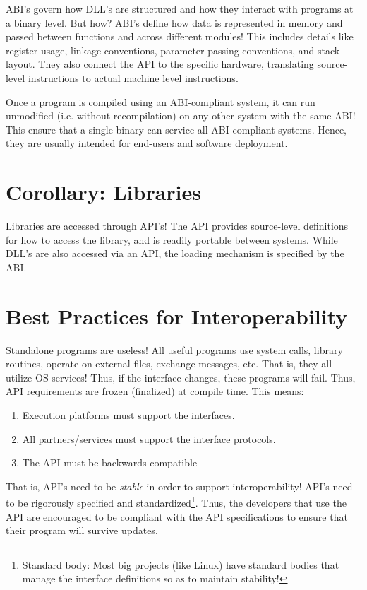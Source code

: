 \documentclass{report}
\begin{document}
ABI's govern how DLL's are structured and how they interact with programs at a binary level. But
how? ABI's define how data is represented in memory and passed between functions and across
different modules! This includes details like register usage, linkage conventions, parameter passing
conventions, and stack layout. They also connect the API to the specific hardware, translating
source-level instructions to actual machine level instructions.

Once a program is compiled using an ABI-compliant system, it can run unmodified (i.e. without
recompilation) on any other system with the same ABI! This ensure that a single binary can service 
all ABI-compliant systems. Hence, they are usually intended for end-users and software deployment.


\section{Corollary: Libraries}
Libraries are accessed through API's! The API provides source-level definitions for how to access
the library, and is readily portable between systems. While DLL's are also accessed via an API, the
loading mechanism is specified by the ABI.


\section{Best Practices for Interoperability}
Standalone programs are useless! All useful programs use system calls, library routines, operate on
external files, exchange messages, etc. That is, they all utilize OS services! Thus, if the
interface changes, these programs will fail. Thus, API requirements are frozen (finalized) at
compile time. This means:

\begin{enumerate}[label=\textit{(\roman*)}]
\item Execution platforms must support the interfaces.
\item All partners/services must support the interface protocols.
\item The API must be backwards compatible
\end{enumerate}

That is, API's need to be \textit{stable} in order to support interoperability! API's need to be
rigorously specified and standardized\footnote{Standard body: Most big projects (like Linux) have
  standard bodies that manage the interface definitions so as to maintain stability!}. Thus, the
developers that use the API are encouraged to be compliant with the API specifications to ensure
that their program will survive updates.
\end{document}
